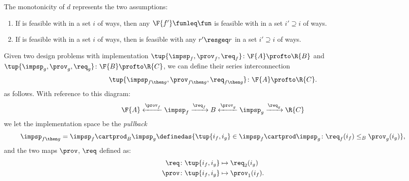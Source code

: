{    \noindent The monotonicity of $d$ represents the two assumptions:
    \begin{enumerate}
        \item If \fun is feasible with \res in a set $i$ of ways, then any $\F{f'}\funleq \fun$ is feasible with \res in a set $i'\supseteq i$ of ways.
        \item If \fun is feasible with \res in a set $i$ of ways, then \fun is feasible with any $r'\resgeq r$ in a set $i'\supseteq i$ of ways.
    \end{enumerate}

    \begin{definition}
        \label{def:seriesdpi}
        Given two design problems with implementation $\tup{\impsp_f,\prov_f,\req_f}\colon \F{A}\profto \R{B}$ and $\tup{\impsp_g,\prov_g,\req_g}\colon \F{B}\profto \R{C}$, we can define their series interconnection
        \begin{equation*}
            \tup{\impsp_{f\then g},\prov_{f\then g},\req_{f\then g}}\colon \F{A}\profto \R{C}.
        \end{equation*}
        as follows.
        With reference to this diagram:
        \begin{equation}
            \F{A} \xleftarrow{\prov_f} \impsp_f \xrightarrow{\req_f} B
            \xleftarrow{\prov_g} \impsp_g \xrightarrow{\req_g} \R{C}
        \end{equation}
        we let the implementation space be the \emph{pullback}
        \begin{equation}
            \begin{aligned}
                \impsp_{f\then g} & = \impsp_f \cartprod_B \impsp_g \definedas \{
                \tup{i_f,i_g} \in \impsp_f \cartprod \impsp_g \colon
                \req_f(i_f) \leq_{B} \prov_g(i_g)
                \}, \\
            \end{aligned}
        \end{equation}
        and the two maps $\prov$, $\req$ defined as:
        \begin{equation}
            \begin{aligned}
                \req  & \colon \tup{i_f,i_g} \mapsto \req_2(i_g) \\
                \prov & \colon  \tup{i_f,i_g} \mapsto \prov_1(i_f).
            \end{aligned}
        \end{equation}

\end{definition}}
